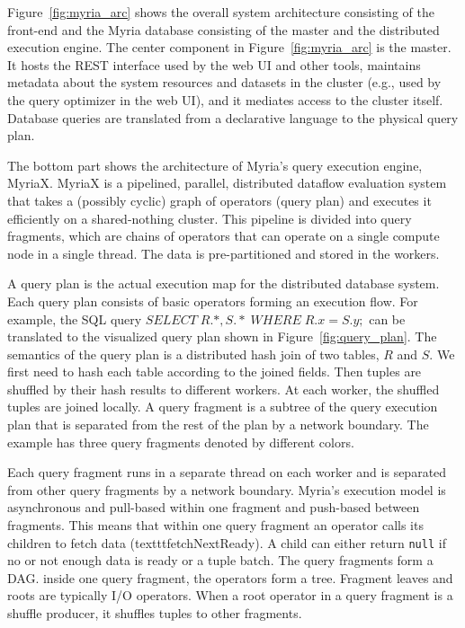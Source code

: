 \documentclass[11pt]{scrartcl}
\begin{document}
Figure~\ref{fig:myria_arc} shows the overall system architecture consisting of the front-end and the Myria database consisting of the master and the distributed execution engine. The center component in Figure~\ref{fig:myria_arc} is the master. It hosts the REST interface used by the web UI and other tools, maintains metadata about the system resources and datasets in the cluster (e.g., used by the query optimizer in the web UI), and it mediates access to the cluster itself. Database queries are translated from a declarative language to the physical query plan.

The bottom part shows the architecture of Myria’s query execution engine, MyriaX. MyriaX is a pipelined, parallel, distributed dataflow evaluation system that takes a (possibly cyclic) graph of operators (query plan) and executes it efficiently on a shared-nothing cluster. This pipeline is divided into query fragments, which are chains of operators that can operate on a single compute node in a single thread. The data is pre-partitioned and stored in the workers.

A query plan is the actual execution map for the distributed database system.  Each query plan consists of basic operators forming an execution flow. For example, the SQL query $SELECT \; R.*, S.*  \; WHERE \; R.x=S.y ;$ can be translated to the visualized query plan shown in Figure~\ref{fig:query_plan}. The semantics of the query plan is a distributed hash join of two tables, $R$ and $S$. We first need to hash each table according to the joined fields. Then tuples are shuffled by their hash results to different workers. At each worker, the shuffled tuples are joined locally. A query fragment is a subtree of the query execution plan that is separated from the rest of the plan by a network boundary. The example has three query fragments denoted by different colors.

Each query fragment runs in a separate thread on each worker and is separated from other query fragments by a network boundary. Myria's execution model is asynchronous and pull-based within one fragment and push-based between fragments. This means that within one query fragment an operator calls its children to fetch data (texttt{fetchNextReady}). A child can either return \texttt{null} if no or not enough data is ready or a tuple batch. The query fragments form a DAG. inside one query fragment, the operators form a tree. Fragment leaves and roots are typically I/O operators. When a root operator in a query fragment is a shuffle producer, it shuffles tuples to other fragments.
\end{document}
